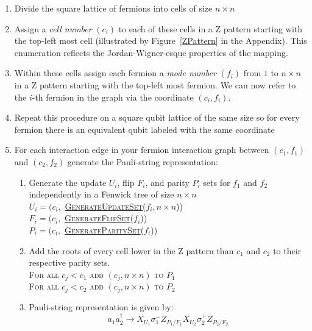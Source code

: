 \begin{enumerate}
    \item Divide the square lattice of fermions into cells of size $n \times n$
    \item Assign a \textit{cell number} $(c_i)$ to each of these cells in a Z pattern starting with the top-left most cell (illustrated by Figure~\ref{ZPattern} in the Appendix). 
    This enumeration reflects the Jordan-Wigner-esque properties of the mapping.
    \item Within these cells assign each fermion a \textit{mode number} $(f_i)$ from $1$ to $n\times n$ in a Z pattern starting with the top-left most fermion. We can now refer to the $i$-th fermion in the graph via the coordinate $(c_i, f_i)$.
    \item Repeat this procedure on a square qubit lattice of the same size so for every fermion there is an equivalent qubit labeled with the same coordinate
    \item For each interaction edge in your fermion interaction graph between $(c_1, f_1)$ and $(c_2, f_2)$ generate the Pauli-string representation:
    \begin{enumerate}
        \item Generate the update $U_i$, flip $F_i$, and parity $P_i$ sets for $f_1$ and $f_2$ independently in a Fenwick tree of size $n \times n$\\
        \textsc{$U_i = (c_i, $ \hyperref[GenerateUpdateSet]{GenerateUpdateSet}($f_i, n\times n$))}\\
        \textsc{$F_i = (c_i, $ \hyperref[GenerateFlipSet]{GenerateFlipSet}($f_i$))}\\
        \textsc{$P_i = (c_i, $ \hyperref[GenerateParitySet]{GenerateParitySet}($f_i$))}
        \item Add the roots of every cell lower in the Z pattern than $c_1$ and $c_2$ to their respective parity sets. \\
        \textsc{For all $c_j < c_1$ add $(c_j, n \times n)$ to $P_1$}\\
        \textsc{For all $c_j < c_2$ add $(c_j, n \times n)$ to $P_2$}
        \item Pauli-string representation is given by:\\
            \begin{dmath*}[style={\footnotesize}]
                    a_1a^{\dagger}_2  \rightarrow X_{U_1}  \sigma^-_1  Z_{P_1/F_1}  X_{U_2}  \sigma^+_2Z_{P_2/F_2}

\end{dmath*}
\end{enumerate}
\end{enumerate}

